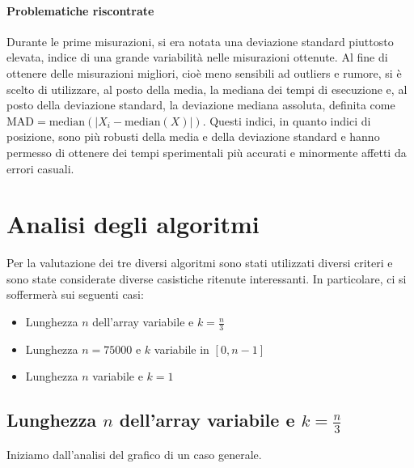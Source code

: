\documentclass{article}
\begin{document}
	\paragraph{Problematiche riscontrate}
	Durante le prime misurazioni, si era notata una deviazione standard piuttosto elevata, indice di una grande variabilità nelle misurazioni ottenute. Al fine di ottenere delle misurazioni migliori, cioè meno sensibili ad outliers e rumore, si è scelto di utilizzare, al posto della media, la mediana dei tempi di esecuzione e, al posto della deviazione standard, la deviazione mediana assoluta, definita come $\textrm{MAD}=\textrm{median}\left(\mathopen|X_{i}-\textrm{median}\left(X\right)\mathclose|\right)$. Questi indici, in quanto indici di posizione, sono più robusti della media e della deviazione standard e hanno permesso di ottenere dei tempi sperimentali più accurati e minormente affetti da errori casuali.
	
	\newpage	
	\section{Analisi degli algoritmi}
	Per la valutazione dei tre diversi algoritmi sono stati utilizzati diversi criteri e sono state considerate diverse casistiche ritenute interessanti. In particolare, ci si soffermerà sui seguenti casi:
	
	\begin{itemize}
		\item Lunghezza $n$ dell'array variabile e $k=\frac{n}{3}$
		\item Lunghezza $n=75000$ e $k$ variabile in $[0,n-1]$
		\item Lunghezza $n$ variabile e $k=1$
	\end{itemize}
	
	\newpage
	
	\subsection{Lunghezza $n$ dell'array variabile e $k=\frac{n}{3}$}
	\label{subsection:nvar_k_n3}
	Iniziamo dall'analisi del grafico di un caso generale.
	
\end{document}

